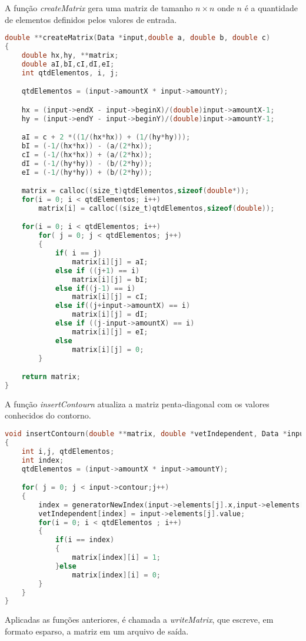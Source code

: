 \documentclass[
	11pt,				%
	oneside,			%
	a4paper,			%
	english,			%
	brazil,				%
	]{article}
\begin{document}
A função \textit{createMatrix} gera uma matriz de tamanho $n \times n$ onde $n$ é a quantidade de elementos definidos pelos valores de entrada.
\begin{lstlisting}[language=C, caption=Função Cria Matriz]
double **createMatrix(Data *input,double a, double b, double c)
{
	double hx,hy, **matrix;
	double aI,bI,cI,dI,eI;
	int qtdElementos, i, j;

	qtdElementos = (input->amountX * input->amountY);

	hx = (input->endX - input->beginX)/(double)input->amountX-1;
	hy = (input->endY - input->beginY)/(double)input->amountY-1;

	aI = c + 2 *((1/(hx*hx)) + (1/(hy*hy)));
	bI = (-1/(hx*hx)) - (a/(2*hx));
	cI = (-1/(hx*hx)) + (a/(2*hx));
	dI = (-1/(hy*hy)) - (b/(2*hy));
	eI = (-1/(hy*hy)) + (b/(2*hy));

	matrix = calloc((size_t)qtdElementos,sizeof(double*));
	for(i = 0; i < qtdElementos; i++)
		matrix[i] = calloc((size_t)qtdElementos,sizeof(double));

	for(i = 0; i < qtdElementos; i++)
		for( j = 0; j < qtdElementos; j++)
		{
			if( i == j)
				matrix[i][j] = aI;
			else if ((j+1) == i)
				matrix[i][j] = bI;
			else if((j-1) == i)
				matrix[i][j] = cI;
			else if((j+input->amountX) == i)
				matrix[i][j] = dI;
			else if ((j-input->amountX) == i)
				matrix[i][j] = eI;
			else
				matrix[i][j] = 0;
		}

	return matrix;
}
\end{lstlisting}

A função \textit{insertContourn} atualiza a matriz penta-diagonal com os valores conhecidos do contorno.
\begin{lstlisting}[language=C, caption=Função Insere Contorno]
void insertContourn(double **matrix, double *vetIndependent, Data *input)
{
	int i,j, qtdElementos;
	int index;
	qtdElementos = (input->amountX * input->amountY);

	for( j = 0; j < input->contour;j++)
	{
		index = generatorNewIndex(input->elements[j].x,input->elements[j].y,input->amountX);
		vetIndependent[index] = input->elements[j].value;
		for(i = 0; i < qtdElementos ; i++)
		{
			if(i == index)
			{
				matrix[index][i] = 1;
			}else
				matrix[index][i] = 0;
		}
	}
}
\end{lstlisting}

Aplicadas as funções anteriores, é chamada a \textit{writeMatrix}, que escreve, em formato esparso, a matriz em um arquivo de saída.
\end{document}

